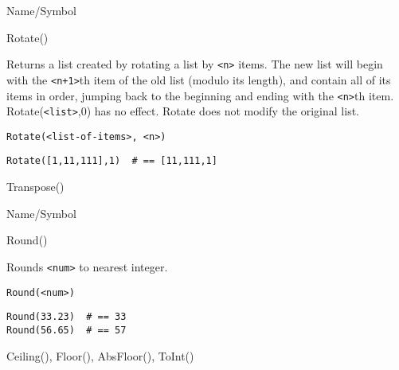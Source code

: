 \begin{desc}{Name/Symbol}
\item[Name/Symbol]	Rotate()

\item[Description] 	Returns a list created by rotating a list by \verb!<n>! items.  
		The new list will begin with the \verb!<n+1>!th item of the old 
		list (modulo its length), and contain all of its items in 
		order, jumping back to the beginning and ending with the \verb!<n>!th
		item. Rotate(\verb!<list>!,0) has no effect.  Rotate does not modify 
		the original list.

\item[Usage]
\begin{verbatim}
Rotate(<list-of-items>, <n>)
\end{verbatim}

\item[Example]     	
\begin{verbatim}
Rotate([1,11,111],1)  # == [11,111,1]
\end{verbatim}

\item[See Also]    	Transpose()
\end{desc}

\rl


\begin{desc}{Name/Symbol}
\item[Name/Symbol] 	Round()

\item[Description] 	Rounds \verb+<num>+ to nearest integer.

\item[Usage]        	
\begin{verbatim}
Round(<num>)
\end{verbatim}

\item[Example]
\begin{verbatim}
Round(33.23)  # == 33
Round(56.65)  # == 57
\end{verbatim}

\item[See Also]     	Ceiling(), Floor(), AbsFloor(), ToInt()
\end{desc}

\rl


